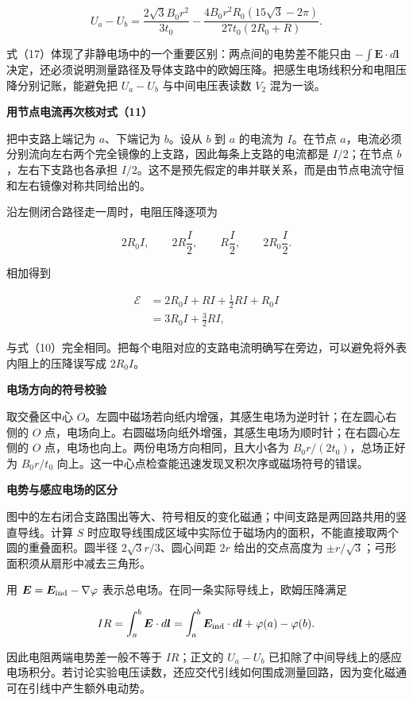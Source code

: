 \documentclass[12pt,a4paper,UTF8]{ctexart}
\begin{document}
\[
\boxed{
U_a-U_b=
\frac{2\sqrt3B_0r^2}{3t_0}
-\frac{4B_0r^2R_0(15\sqrt3-2\pi)}
{27t_0(2R_0+R)}
}.
\tag{17}
\]

式（17）体现了非静电场中的一个重要区别：两点间的电势差不能只由
\(-\int\bm E\cdot d\bm l\)
决定，还必须说明测量路径及导体支路中的欧姆压降。把感生电场线积分和电阻压降分别记账，能避免把
\(U_a-U_b\) 与中间电压表读数 \(V_2\) 混为一谈。

\textbf{用节点电流再次核对式（11）}

把中支路上端记为 \(a\)、下端记为 \(b\)。设从 \(b\) 到 \(a\) 的电流为
\(I\)。在节点
\(a\)，电流必须分别流向左右两个完全镜像的上支路，因此每条上支路的电流都是
\(I/2\)；在节点 \(b\)，左右下支路也各承担
\(I/2\)。这不是预先假定的串并联关系，而是由节点电流守恒和左右镜像对称共同给出的。

沿左侧闭合路径走一周时，电阻压降逐项为

\[
2R_0I,\qquad 2R\frac I2,\qquad R\frac I2,\qquad 2R_0\frac I2.
\]

相加得到

\[
\begin{aligned}
\mathcal E
&=2R_0I+R I+\frac12RI+R_0I\\
&=3R_0I+\frac32RI,
\end{aligned}
\]

与式（10）完全相同。把每个电阻对应的支路电流明确写在旁边，可以避免将外表内阻上的压降误写成
\(2R_0I\)。

\textbf{电场方向的符号校验}

取交叠区中心
\(O\)。左圆中磁场若向纸内增强，其感生电场为逆时针；在左圆心右侧的 \(O\)
点，电场向上。右圆磁场向纸外增强，其感生电场为顺时针；在右圆心左侧的
\(O\) 点，电场也向上。两份电场方向相同，且大小各为
\(B_0r/(2t_0)\)，总场正好为 \(B_0r/t_0\)
向上。这一中心点检查能迅速发现叉积次序或磁场符号的错误。

\textbf{电势与感应电场的区分}

图中的左右闭合支路围出等大、符号相反的变化磁通；中间支路是两回路共用的竖直导线。计算
\(S\)
时应取导线围成区域中实际位于磁场内的面积，不能直接取两个圆的重叠面积。圆半径
\(2\sqrt3r/3\)、圆心间距 \(2r\) 给出的交点高度为
\(\pm r/\sqrt3\)；弓形面积须从扇形中减去三角形。

用 \(\bm E=\bm E_{\rm ind}-\nabla\varphi\)
表示总电场。在同一条实际导线上，欧姆压降满足

\[IR=\int_a^b\bm E\cdot d\bm l=\int_a^b\bm E_{\rm ind}\cdot d\bm l+\varphi(a)-\varphi(b).\]

因此电阻两端电势差一般不等于 \(IR\)；正文的 \(U_a-U_b\)
已扣除了中间导线上的感应电场积分。若讨论实验电压读数，还应交代引线如何围成测量回路，因为变化磁通可在引线中产生额外电动势。
\end{document}
